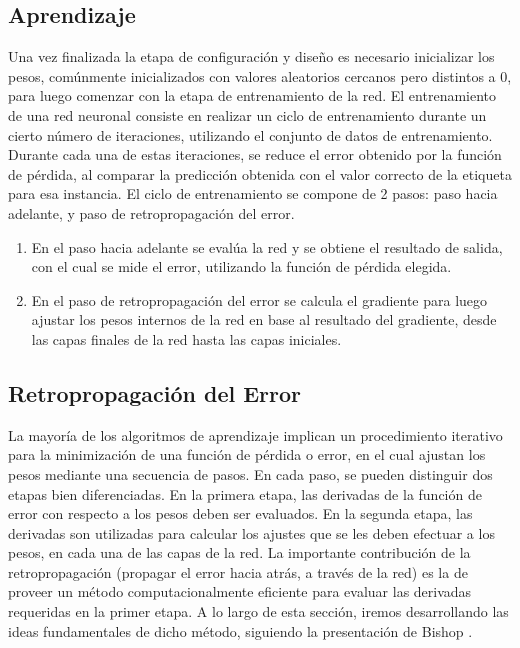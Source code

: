 \documentclass[a4paper,11pt,spanish]{book}
\begin{document}
      \subsection {Aprendizaje}
	Una vez finalizada la etapa de configuración y diseño es necesario inicializar los pesos, comúnmente inicializados con valores aleatorios cercanos pero distintos a 0, 
	para luego comenzar con la etapa de entrenamiento de la red.
	El entrenamiento de una red neuronal consiste en realizar un ciclo de entrenamiento durante un cierto número de iteraciones, utilizando el conjunto de datos de 
	entrenamiento. 
	Durante cada una de estas iteraciones, se reduce el error obtenido por la función de pérdida, al comparar la predicción obtenida con el valor correcto de la 
	etiqueta para esa instancia.
	El ciclo de entrenamiento se compone de 2 pasos: paso hacia adelante, y paso de retropropagación del error.
	
	\begin{enumerate}
	  \item En el paso hacia adelante se evalúa la red y se obtiene el resultado de salida, con el cual se mide el error, utilizando la función de pérdida elegida.
	  \item En el paso de retropropagación del error se calcula el gradiente para luego ajustar los pesos internos de la red en base al resultado del gradiente,
	    desde las capas finales de la red hasta las capas iniciales.
	\end{enumerate}

      \subsection{Retropropagación del Error} \label{sec:backpropagation}
	La mayoría de los algoritmos de aprendizaje implican un procedimiento iterativo para la minimización de una función de pérdida o error, en el cual ajustan 
	los pesos mediante una secuencia de pasos. 
	En cada paso, se pueden distinguir dos etapas bien diferenciadas. En la primera etapa, las derivadas de la función de error con
	respecto a los pesos deben ser evaluados. 
	En la segunda etapa, las derivadas son utilizadas para calcular los ajustes que se les deben efectuar a los pesos, en cada una
	de las capas de la red. 
	La importante contribución de la retropropagación (propagar el error hacia atrás, a través de la red) es la de proveer un
	método computacionalmente eficiente para evaluar las derivadas requeridas en la primer etapa. 
	A lo largo de esta sección, iremos desarrollando las ideas fundamentales de dicho método, siguiendo la presentación de Bishop \cite{Bishop:MachineLearning}.
\end{document}
